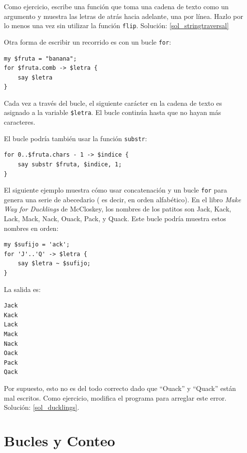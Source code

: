 Como ejercicio, escribe una función que toma una cadena de 
texto como un argumento y muestra las letras de atrás hacia
adelante, una por línea. Hazlo por lo menos una vez sin utilizar
la función {\tt flip}. Solución: \ref{sol_stringtraversal}

Otra forma de escribir un recorrido es con un bucle {\tt for}:

\begin{verbatim}
my $fruta = "banana";
for $fruta.comb -> $letra {
    say $letra
}
\end{verbatim}
%

Cada vez a través del bucle, el siguiente carácter en la
cadena de texto es asignado a la variable {\tt \$letra}.
El bucle continúa hasta que no hayan más caracteres.

El bucle podría también usar la función {\tt substr}:

\begin{verbatim}
for 0..$fruta.chars - 1 -> $indice {
    say substr $fruta, $indice, 1;
}
\end{verbatim}
%


El siguiente ejemplo muestra cómo usar concatenación y
un bucle {\tt for} para genera una serie de abecedario (
es decir, en orden alfabético). En el libro 
{\em Make Way for Ducklings} de McCloskey, los nombres de los
patitos son Jack, Kack, Lack, Mack, Nack, Ouack, Pack, y Quack. 
Este bucle podría muestra estos nombres en orden:

\begin{verbatim}
my $sufijo = 'ack';
for 'J'..'Q' -> $letra {
    say $letra ~ $sufijo;
}
\end{verbatim}
%
La salida es:

\begin{verbatim}
Jack
Kack
Lack
Mack
Nack
Oack
Pack
Qack
\end{verbatim}
%
Por supuesto, esto no es del todo correcto dado que ``Ouack'' y 
``Quack'' están mal escritos. Como ejercicio, modifica el programa
para arreglar este error. Solución: \ref{sol_ducklings}.


\section{Bucles y Conteo}
\label{counter}

